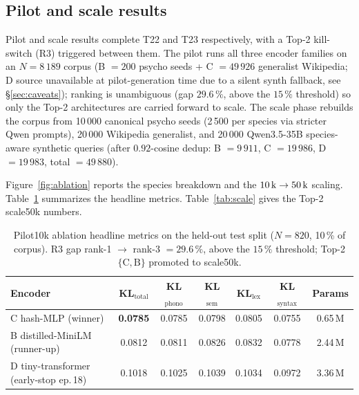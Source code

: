 \subsection{Pilot and scale results}

Pilot and scale results complete T22 and T23 respectively, with a
Top-2 kill-switch (R3) triggered between them. The pilot runs all
three encoder families on an $N = 8\,189$ corpus (B $= 200$
psycho seeds + C $= 49\,926$ generalist Wikipedia; D source
unavailable at pilot-generation time due to a silent synth
fallback, see \S\ref{sec:caveats}); ranking is unambiguous
(gap $29.6\,\%$, above the $15\,\%$ threshold) so only the Top-2
architectures are carried forward to scale. The scale phase
rebuilds the corpus from 10\,000 canonical psycho seeds
(2\,500 per species via stricter Qwen prompts),
20\,000 Wikipedia generalist, and 20\,000 Qwen3.5-35B
species-aware synthetic queries (after $0.92$-cosine dedup:
B $= 9\,911$, C $= 19\,986$, D $= 19\,983$, total $= 49\,880$).

Figure~\ref{fig:ablation} reports the species breakdown and the
$10\text{\,k} \to 50\text{\,k}$ scaling. Table~\ref{tab:results}
summarizes the headline metrics. Table~\ref{tab:scale} gives the
Top-2 scale50k numbers.

\begin{table}[t]
  \centering
  \small
  \begin{tabular}{lcccccc}
    \toprule
    Encoder & KL$_{\mathrm{total}}$ & KL$_{\mathrm{phono}}$ & KL$_{\mathrm{sem}}$ & KL$_{\mathrm{lex}}$ & KL$_{\mathrm{syntax}}$ & Params \\
    \midrule
    C hash-MLP (winner)         & \textbf{0.0785} & 0.0785 & 0.0798 & 0.0805 & 0.0755 & 0.65\,M \\
    B distilled-MiniLM (runner-up) & 0.0812 & 0.0811 & 0.0826 & 0.0832 & 0.0778 & 2.44\,M \\
    D tiny-transformer (early-stop ep.\,18) & 0.1018 & 0.1025 & 0.1039 & 0.1034 & 0.0972 & 3.36\,M \\
    \bottomrule
  \end{tabular}
  \caption{Pilot10k ablation headline metrics on the held-out
    test split ($N = 820$, 10\,\% of corpus). R3 gap rank-1
    $\to$ rank-3 $= 29.6\,\%$, above the $15\,\%$ threshold;
    Top-2 $\{\mathrm{C}, \mathrm{B}\}$ promoted to scale50k.}
  \label{tab:results}
\end{table}

